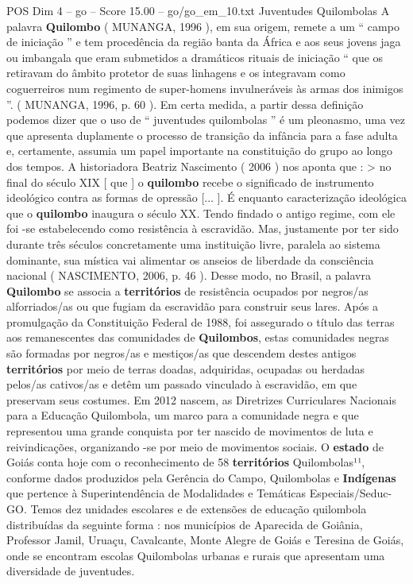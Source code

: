 \begin{textsample}{POS Dim 4 – go – Score 15.00 – go/go\_em\_10.txt}  \label{ex:f4_pos_064}
Juventudes Quilombolas A palavra \textbf{Quilombo} ( MUNANGA, 1996 ), em sua origem, remete a um “ campo de iniciação ” e tem procedência da região banta da África e aos seus jovens jaga ou imbangala que eram submetidos a dramáticos rituais de iniciação “ que os retiravam do âmbito protetor de suas linhagens e os integravam como coguerreiros num regimento de super-homens invulneráveis às armas dos inimigos ”. ( MUNANGA, 1996, p. 60 ).
Em certa medida, a partir dessa definição podemos dizer que o uso de “ juventudes quilombolas ” é um pleonasmo, uma vez que apresenta duplamente o processo de transição da infância para a fase adulta e, certamente, assumia um papel importante na constituição do grupo ao longo dos tempos.
A historiadora Beatriz Nascimento ( 2006 ) nos aponta que : > no final do século XIX [ que ] o \textbf{quilombo} recebe o significado de instrumento ideológico contra as formas de opressão [... ].
É enquanto caracterização ideológica que o \textbf{quilombo} inaugura o século XX.
Tendo findado o antigo regime, com ele foi -se estabelecendo como resistência à escravidão.
Mas, justamente por ter sido durante três séculos concretamente uma instituição livre, paralela ao sistema dominante, sua mística vai alimentar os anseios de liberdade da consciência nacional ( NASCIMENTO, 2006, p. 46 ).
Desse modo, no Brasil, a palavra \textbf{Quilombo} se associa a \textbf{territórios} de resistência ocupados por negros/as alforriados/as ou que fugiam da escravidão para construir seus lares.
Após a promulgação da Constituição Federal de 1988, foi assegurado o título das terras aos remanescentes das comunidades de \textbf{Quilombos}, estas comunidades negras são formadas por negros/as e mestiços/as que descendem destes antigos \textbf{territórios} por meio de terras doadas, adquiridas, ocupadas ou herdadas pelos/as cativos/as e detêm um passado vinculado à escravidão, em que preservam seus costumes.
Em 2012 nascem, as Diretrizes Curriculares Nacionais para a Educação Quilombola, um marco para a comunidade negra e que representou uma grande conquista por ter nascido de movimentos de luta e reivindicações, organizando -se por meio de movimentos sociais.
O \textbf{estado} de Goiás conta hoje com o reconhecimento de 58 \textbf{territórios} Quilombolas¹¹, conforme dados produzidos pela Gerência do Campo, Quilombolas e \textbf{Indígenas} que pertence à Superintendência de Modalidades e Temáticas Especiais/Seduc-GO.
Temos dez unidades escolares e de extensões de educação quilombola distribuídas da seguinte forma : nos municípios de Aparecida de Goiânia, Professor Jamil, Uruaçu, Cavalcante, Monte Alegre de Goiás e Teresina de Goiás, onde se encontram escolas Quilombolas urbanas e rurais que apresentam uma diversidade de juventudes.

\end{textsample}
